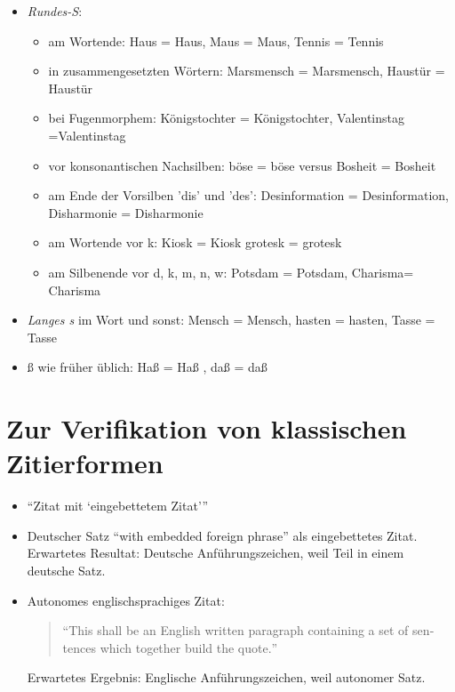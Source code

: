\documentclass[
  DIV=calc,
  BCOR=5mm,
  11pt,
  headings=small,
  oneside,
  abstract=true,
  toc=bib,
  english,ngerman]{scrartcl}
\begin{document}
\begin{itemize}
  \item \textit{Rundes-S}:
  \begin{itemize}
    \item[\faXmark] am Wortende: Haus = {\suetterhjz Hau\-s}, Maus = {\suetterhjz Maus}, Tennis = {\suetterhjz Tennis} 
    \item[\faXmark] in zusammengesetzten Wörtern: Marsmensch = {\suetterhjz Mars\-mensch}, Haustür = {\suetterhjz Haus\-tür}
    \item[\faXmark] bei Fugenmorphem: Königstochter = {\suetterhjz Königs\-tochter}, Valentins\-tag ={\suetterhjz Valentins\-tag}
    \item[\faXmark] vor konsonantischen Nachsilben: böse = {\suetterhjz böse} versus Bosheit = {\suetterhjz Bos\-heit}
    \item[\faXmark] am Ende der Vorsilben 'dis' und 'des': Desinformation = {\suetterhjz Des\-information}, Disharmonie = {\suetterhjz Dis\-harmonie}
    \item[\faXmark] am Wortende vor k: Kiosk = {\suetterhjz Kios\-k} grotesk = {\suetterhjz grotes\-k}
    \item[\faXmark] am Silbenende vor d, k, m, n, w: Potsdam = {\suetterhjz Pots\-dam}, Charisma= {\suetterhjz Charis\-ma}
  \end{itemize}
  \item[\faCheck] \textit{Langes s} im Wort und sonst: Mensch = {\suetterhjz Mensch}, hasten = {\suetterhjz hasten}, Tasse = {\suetterhjz Tasse}
  \item[\faCheck] ß wie früher üblich: Haß = {\suetterhjz Ha\ss} , daß = {\suetterhjz da\ss}
\end{itemize}

\section{Zur Verifikation von klassischen Zitierformen}


\begin{itemize}

  \item \enquote{Zitat mit \enquote{eingebettetem Zitat}}

  \item Deutscher Satz \foreignquote{german}{with embedded foreign phrase}
  als eingebettetes Zitat. Erwartetes Resultat: Deutsche Anführungszeichen,
  weil Teil in einem deutsche Satz.

  \item Autonomes englischsprachiges Zitat:
  \begin{quote}
    \foreignquote{english}{This shall be an English written paragraph containing
    a set of sentences which together build the quote.}
  \end{quote}
  Erwartetes Ergebnis: Englische Anführungszeichen, weil autonomer Satz.
\end{itemize}
\end{document}
